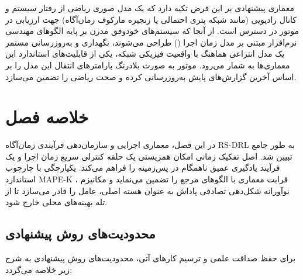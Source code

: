 \documentclass[oneside,openany,phd]{TMU-Thesis}
\begin{document}
معماری پیشنهادی بر این فرض تکیه دارد که یک مدل صوری ریاضی از رفتار سیستم و کانال رادیویی (مانند شبکه پتری احتمالی یا زنجیره مارکوف زمان‌آگاه) جهت ارزیابی در موتور  \cite{david2015uppaal} در دسترس است. از آنجا که سیستم‌های خودوفق مدرن بر پایه الگوهای مهندسی نرم‌افزار مبتنی بر مدل زمان اجرا () \cite{blair2009models} طراحی می‌شوند، نگهداری و به‌روزرسانی مستمر یک مدل انتزاعی هماهنگ با واقعیت فیزیکی شبکه، یکی از قابلیت‌های استاندارد این معماری‌ها به شمار می‌رود. موتور  \cite{david2015uppaal} به صورت بلادرنگ پارامترهای انتقال این مدل را بر اساس آخرین گزارش‌های پایش به‌روزرسانی کرده و صحت ریاضی را تضمین می‌سازد.





\section{خلاصه فصل}

\label{sec:summary-process}



در این فصل، معماری اجرایی و سازمان‌دهی فرآیندی زمان‌آگاه RS-DRL به طور جامع تبیین شد. اصل تفکیک زمانی امکان همزیستی یک حلقه کنترلی سریع زمان اجرا و یک فرآیند یادگیری عمیق ناهمگام در پس‌زمینه را فراهم می‌کند. یکپارچگی با چارچوب استاندارد MAPE-K \cite{kephart2003vision}، قرابت معماری با الگوهای مرجع را تضمین می‌نماید و مکانیزم نوآورانه شکل‌دهی تصادفی پاداش به عنوان هسته اصلی، عامل را قادر می‌سازد تا از تله بهینه‌های محلی خارج شود.



\subsection{محدودیت‌های روش پیشنهادی}

\label{subsec:methodology_limitations}

برای حفظ صداقت علمی و ترسیم کارهای آتی، محدودیت‌های روش پیشنهادی به شرح زیر خلاصه می‌گردد:
\end{document}
